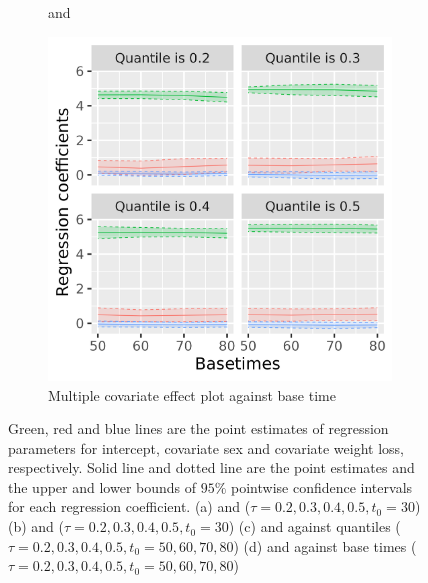 \begin{figure}[ht]
\begin{subfigure}[b]{0.47\linewidth}
    \caption{ and }    
    \label{fig:realdata_multi_quantile}
  \end{subfigure}
  \begin{subfigure}[b]{0.47\linewidth}
    \includegraphics[width = 1.0\textwidth]{realdata_multi_basetime.png}
    \caption{Multiple covariate effect plot against base time}    
    \label{fig:realdata_multi_basetime}
  \end{subfigure}
  \caption{Green, red and blue lines are the point estimates of regression parameters for 
  intercept, covariate sex and covariate weight loss, respectively. Solid line and dotted line are the point estimates and the upper and lower bounds of $95\%$ pointwise confidence intervals for each regression coefficient.
    (a)  and  ($\tau = 0.2, 0.3, 0.4, 0.5, t_0=30$)
    (b)  and  ($\tau = 0.2, 0.3, 0.4, 0.5, t_0=30$)
    (c)  and  against quantiles ($\tau = 0.2, 0.3, 0.4, 0.5, t_0 = 50, 60, 70, 80$)
    (d)  and  against base times ($\tau = 0.2, 0.3, 0.4, 0.5, t_0 = 50, 60, 70, 80$)}
  \label{fig:realdata}
\end{figure}

